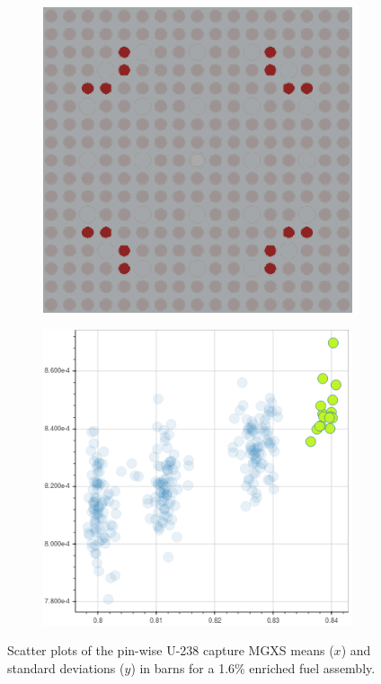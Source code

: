 \documentclass[12pt,twoside]{mitthesis-exec}
\begin{document}
\begin{figure}[h!]
\begin{subfigure}{0.45\textwidth}
  \caption{}
  \label{fig:chap10-capt-mean-std-mgxs-2}
\end{subfigure}
\begin{subfigure}{0.45\textwidth}
  \centering
  \includegraphics[width=0.9\linewidth]{figures/unsupervised/features/assm-16/u238-capt/mean-std/geometry-3}
  \caption{}
  \label{fig:chap10-capt-mean-std-geom-3}
\end{subfigure}%
\begin{subfigure}{0.45\textwidth}
  \centering
  \includegraphics[width=0.9\linewidth]{figures/unsupervised/features/assm-16/u238-capt/mean-std/mgxs-3}
  \caption{}
  \label{fig:chap10-capt-mean-std-mgxs-3}
\end{subfigure}
\caption[Clustering of U-238 capture MGXS]{Scatter plots of the pin-wise U-238 capture MGXS means ($x$) and standard deviations ($y$) in barns for a 1.6\% enriched fuel assembly.}
\label{fig:capt-mean-std}
\end{figure}
\end{document}
